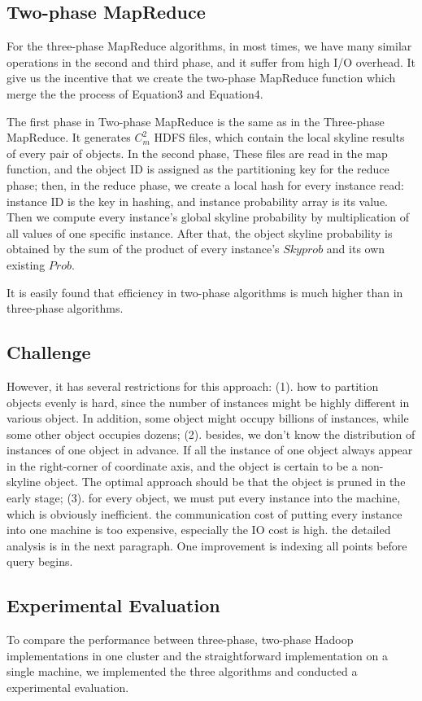 \subsection{Two-phase MapReduce}
For the three-phase MapReduce algorithms, in most times, we have many similar operations in the second and third phase, and it suffer from high I/O overhead. It give us the incentive that we create the two-phase MapReduce function which merge the the process of Equation3 and Equation4.

The first phase in Two-phase MapReduce is the same as in the Three-phase MapReduce. It generates \(C_{m}^{2}\) HDFS files, which contain the local skyline results of every pair of objects. In the second phase, These files are read in the map function, and the object ID is assigned as the partitioning key for the reduce phase; then, in the reduce phase, we create a local hash for every instance read: instance ID is the key in hashing, and instance probability array is its value. Then we compute every instance's global skyline probability by multiplication of all values of one specific instance. After that, the object skyline probability is obtained by the sum of the product of every instance's \(Skyprob\) and its own existing \(Prob\).

It is easily found that efficiency in two-phase algorithms is much higher than in three-phase algorithms.
\subsection{Challenge}
However, it has several restrictions for this approach: (1). how to partition objects evenly is hard, since the number of instances might be highly different in various object. In addition, some object might occupy billions of instances, while some other object occupies dozens; (2). besides, we don't know the distribution of instances of one object in advance. If all the instance of one object always appear in the right-corner of coordinate axis, and the object is certain to be a non-skyline object. The optimal approach should be that the object is pruned in the early stage; (3). for every object, we must put every instance into the machine, which is obviously inefficient. the communication cost of putting every instance into one machine is too expensive, especially the IO cost is high. the detailed analysis is in the next paragraph. One improvement is indexing all points before query begins.



\subsection{Experimental Evaluation}
To compare the performance between three-phase, two-phase Hadoop implementations in one cluster and the straightforward implementation on a single machine, we implemented the three algorithms and conducted a experimental evaluation.

